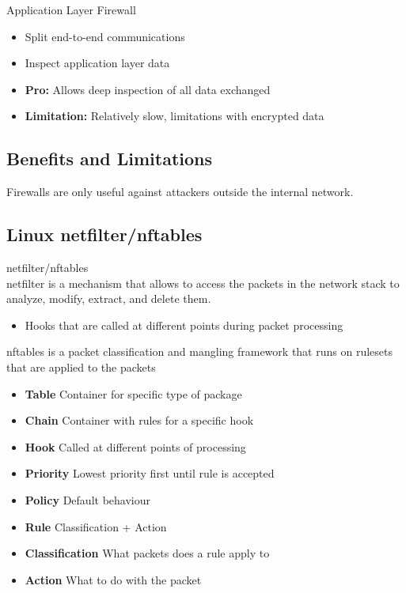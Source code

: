 \begin{definition}{Application Layer Firewall}\\
    \begin{itemize}
        \item Split end-to-end communications
        \item Inspect application layer data
        \item \textbf{Pro:} Allows deep inspection of all data exchanged
        \item \textbf{Limitation:} Relatively slow, limitations with encrypted data
    \end{itemize}
\end{definition}


\subsection{Benefits and Limitations}

\begin{remark}
    Firewalls are only useful against attackers outside the internal network.
\end{remark}

\subsection{Linux netfilter/nftables}

\begin{definition}{netfilter/nftables}\\
    netfilter is a mechanism that allows to access the packets in the network stack to analyze, modify, extract, and delete them.
    \begin{itemize}
        \item Hooks that are called at different points during packet processing
    \end{itemize}
    
    nftables is a packet classification and mangling framework that runs on rulesets that are applied to the packets
    \begin{itemize}
        \item \textbf{Table} Container for specific type of package
        \item \textbf{Chain} Container with rules for a specific hook
        \item \textbf{Hook} Called at different points of processing
        \item \textbf{Priority} Lowest priority first until rule is accepted
        \item \textbf{Policy} Default behaviour
        \item \textbf{Rule} Classification + Action
        \item \textbf{Classification} What packets does a rule apply to
        \item \textbf{Action} What to do with the packet
    \end{itemize}
\end{definition}


